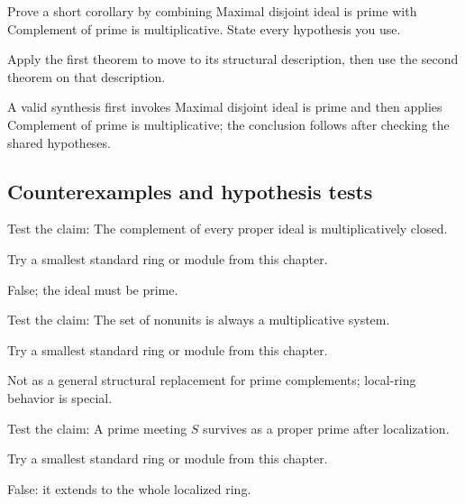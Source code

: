 \begin{exercise}\label{exr:v05-expand-09}
Prove a short corollary by combining Maximal disjoint ideal is prime with Complement of prime is multiplicative. State every hypothesis you use.
\end{exercise}
\begin{hint}
Apply the first theorem to move to its structural description, then use the second theorem on that description.
\end{hint}
\begin{solution}
A valid synthesis first invokes Maximal disjoint ideal is prime and then applies Complement of prime is multiplicative; the conclusion follows after checking the shared hypotheses.
\end{solution}

\subsection*{Counterexamples and hypothesis tests}

\begin{exercise}\label{exr:v05-expand-10}
Test the claim: The complement of every proper ideal is multiplicatively closed.
\end{exercise}
\begin{hint}
Try a smallest standard ring or module from this chapter.
\end{hint}
\begin{solution}
False; the ideal must be prime.
\end{solution}

\begin{exercise}[Nonunits]\label{exr:v05-expand-11}
Test the claim: The set of nonunits is always a multiplicative system.
\end{exercise}
\begin{hint}
Try a smallest standard ring or module from this chapter.
\end{hint}
\begin{solution}
Not as a general structural replacement for prime complements; local-ring behavior is special.
\end{solution}

\begin{exercise}\label{exr:v05-expand-12}
Test the claim: A prime meeting $S$ survives as a proper prime after localization.
\end{exercise}
\begin{hint}
Try a smallest standard ring or module from this chapter.
\end{hint}
\begin{solution}
False: it extends to the whole localized ring.
\end{solution}

